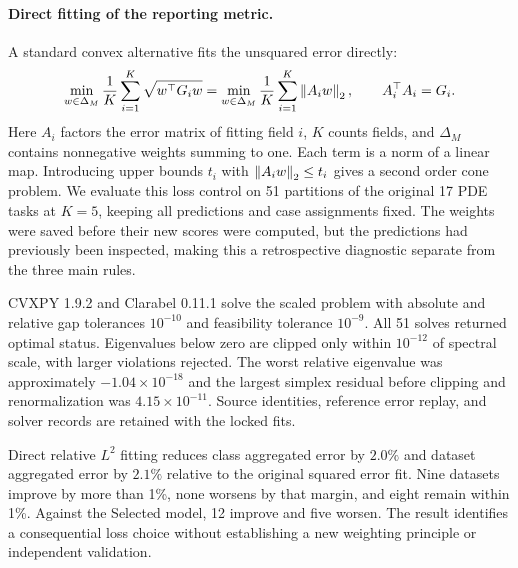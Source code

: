 \paragraph{Direct fitting of the reporting metric.}
A standard convex alternative fits the unsquared error directly:
\begin{equation}
 \min_{w\in\Delta_M}\frac1K\sum_{i=1}^K\sqrt{w^\top G_iw}
 =\min_{w\in\Delta_M}\frac1K\sum_{i=1}^K\left\lVert A_iw\right\rVert_2,
 \qquad A_i^\top A_i=G_i.
 \label{eq:metricfit}
\end{equation}
Here $A_i$ factors the error matrix of fitting field $i$, $K$ counts fields,
and $\Delta_M$ contains nonnegative weights summing to one. Each term is a
norm of a linear map. Introducing upper bounds $t_i$ with
$\left\lVert A_iw\right\rVert_2\leq t_i$ gives a second order cone problem. We evaluate this
loss control on 51 partitions of the original 17 PDE tasks at $K=5$, keeping
all predictions and case assignments fixed. The weights were saved before
their new scores were computed, but the predictions had previously been
inspected, making this a retrospective diagnostic separate from the three
main rules.

CVXPY 1.9.2 and Clarabel 0.11.1 solve the scaled problem with absolute and
relative gap tolerances $10^{-10}$ and feasibility tolerance $10^{-9}$.
All 51 solves returned optimal status. Eigenvalues below zero are clipped
only within $10^{-12}$ of spectral scale, with larger violations rejected.
The worst relative eigenvalue was approximately $-1.04\times10^{-18}$ and the
largest simplex residual before clipping and renormalization was
$4.15\times10^{-11}$. Source identities, reference error replay, and solver
records are retained with the locked fits.

\begin{table}[h!]
\centering\small
\caption{\textbf{Fitting the reporting metric directly.} Ratios compare with
the Selected model on the 17 PDE diagnostic tasks at five fitting examples.
Wins and losses require more than 1\% change after averaging three partitions.
The direct loss fit is a supplementary control, not a fourth main rule.}
\label{tab:losscontrol}
\end{table}

Direct relative $L^2$ fitting reduces class aggregated error by $2.0\%$ and
dataset aggregated error by $2.1\%$ relative to the original squared error
fit. Nine datasets improve by more than 1\%, none worsens by that margin,
and eight remain within 1\%. Against the Selected model, 12 improve and five
worsen. The result identifies a consequential loss choice without establishing
a new weighting principle or independent validation.

